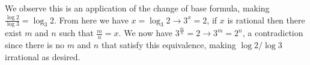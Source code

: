 \begin{mdframed}[style=darkAnswer,frametitle={Joe Starr}]
  We observe this is an application of the change of base formula, making
  $\frac{\log{2}}{\log{3}}=\log_{3}2$. From here we have
  $x=\log_{3}2 \rightarrow 3^x=2$, if $x$ is rational then there exist $m$ and
  $n$ such that $\frac{m}{n}=x$. We now have
  $3^{\frac{m}{n}}=2\rightarrow 3^m=2^n $, a contradiction since there is no
  $m$ and $n$ that satisfy this equivalence, making $\log{2}/\log{3}$
  irrational as desired.
\end{mdframed}


